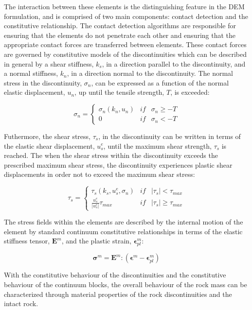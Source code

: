 
The interaction between these elements is the distinguishing feature in the DEM formulation, and is comprised of two main components: contact detection and the constitutive relationship. The contact detection algorithms are responsible for ensuring that the elements do not penetrate each other and ensuring that the appropriate contact forces are transferred between elements. These contact forces are governed by constitutive models of the discontinuities which can be described in general by a shear stiffness, $k_s$, in a direction parallel to the discontinuity, and a normal stiffness, $k_n$, in a direction normal to the discontinuity. The normal stress in the discontinuity, $\sigma_n$, can be expressed as a function of the normal elastic displacement, $u_n$, up until the tensile strength, $T$, is exceeded: 

\begin{equation}
\sigma_n=\left\{\begin{matrix}
\sigma_n\left(k_n, u_n\right) &if&\sigma_n \geq -T\\ 
 0 & if &\sigma_n < -T
\end{matrix}\right.
\label{eqn:demnormal}
\end{equation}

Futhermore, the shear stress, $\tau_s$, in the discontinuity can be written in terms of the elastic shear displacement, $u_s^e$, until the maximum shear strength, $\tau_s$ is reached. The when the shear stress within the discontinuity exceeds the prescribed maximum shear stress, the discontinuity experiences plastic shear displacements in order not to exceed the maximum shear stress:

\begin{equation}
\tau_s=\left\{\begin{matrix}
\tau_s\left(k_s,u_s^e, \sigma_n\right) &if&\left |\tau_{s} \right | < \tau_{max}\\ 
\frac{u_s^e}{\left|u_s^e\right|}\tau_{max} & if &\left |\tau_{s} \right | \geq \tau_{max}
\end{matrix}\right.
\label{eqn:demshear}
\end{equation}

The stress fields within the elements are described by the internal motion of the element by standard continuum constitutive relationships in terms of the elastic stiffness tensor, $\mathbf{E}^m$, and the plastic strain, $\boldsymbol{\epsilon}^m_{pl}$:  

\begin{equation}
\boldsymbol{\sigma}^m =\mathbf{E}^m:\left(\boldsymbol{\epsilon}^m - \boldsymbol{\epsilon}^m_{pl}\right)
\label{eqn:demcont}
\end{equation}

With the constitutive behaviour of the discontinuities and the constitutive behaviour of the continuum blocks, the overall behaviour of the rock mass can be characterized through material properties of the rock discontinuities and the intact rock.